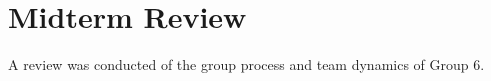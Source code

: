 \chapter{Midterm Review}\label{midterm review}\label{section \thechapter}
A review was conducted of the group process and team dynamics of Group 6.


